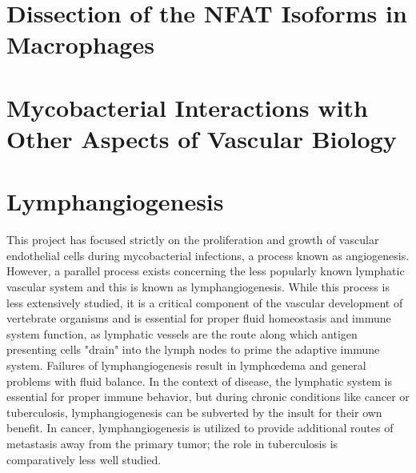 \section{Dissection of the NFAT Isoforms in Macrophages}

\citep{Shiau2015} %

\section{Mycobacterial Interactions with Other Aspects of Vascular Biology}

\citep{Correa2014}
\citep{ClaessonWelsh2015}
\citep{Eklund2017}
\citep{Oehlers2017}
\citep{Hato2008}
\citep{Sakamoto2010}
\citep{Keskin2015}
\citep{Shin2016}

\section{Lymphangiogenesis}

This project has focused strictly on the proliferation and growth of vascular endothelial cells during mycobacterial infections, a process known as angiogenesis. However, a parallel process exists concerning the less popularly known lymphatic vascular system and this is known as lymphangiogenesis. While this process is less extensively studied, it is a critical component of the vascular development of vertebrate organisms and is essential for proper fluid homeostasis and immune system function, as lymphatic vessels are the route along which antigen presenting cells "drain" into the lymph nodes to prime the adaptive immune system. Failures of lymphangiogenesis result in lymph\oe dema and general problems with fluid balance. In the context of disease, the lymphatic system is essential for proper immune behavior, but during chronic conditions like cancer or tuberculosis, lymphangiogenesis can be subverted by the insult for their own benefit. In cancer, lymphangiogenesis is utilized to provide additional routes of metastasis away from the primary tumor; the role in tuberculosis is comparatively less well studied.

\citep{Alitalo2005}
\citep{Bower2017a}
\citep{Bower2017b}
\citep{Bussmann2010}
\citep{Campuzano2017}
\citep{Dietrich2007}
\citep{Duong2012}
\citep{Hogan2009}
\citep{Wong2017b}
\citep{Makinen2001}
\citep{LeGuen2014}
\citep{Kuchler2006}
\citep{Haiko2008}
\citep{Stacker2014}
\citep{Nicenboim2015}
\citep{Onder2017}
\citep{Okuda2012}
\citep{Han2017}
\citep{Jung2017}
\citep{Harding2015}
\citep{vanLessen2017}
\citep{Shin2017}

